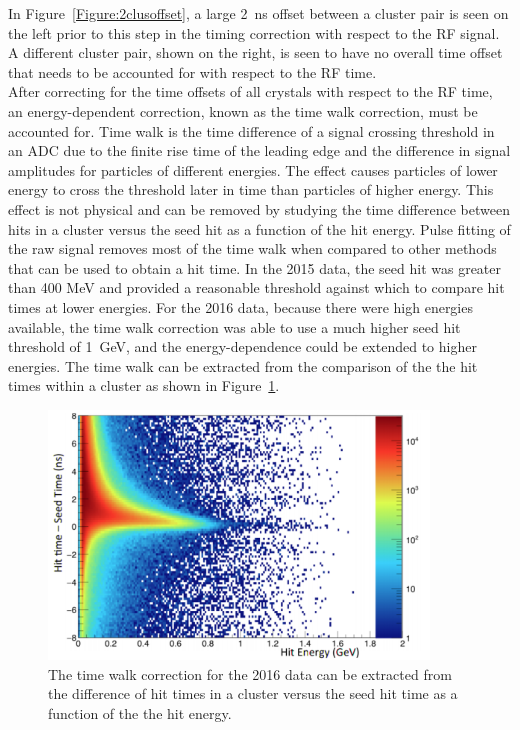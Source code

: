 \documentclass[12pt]{report}
\begin{document}
In Figure~\ref{Figure:2clusoffset}, a large 2~ns offset between a cluster pair is seen on the left prior to this step in the timing correction with respect to the RF signal. A different cluster pair, shown on the right, is seen to have no overall time offset that needs to be accounted for with respect to the RF time. \\
\indent After correcting for the time offsets of all crystals with respect to the RF time, an energy-dependent correction, known as the time walk correction, must be accounted for. Time walk is the time difference of a signal crossing threshold in an ADC due to the finite rise time of the leading edge and the difference in signal amplitudes for particles of different energies. The effect causes particles of lower energy to cross the threshold later in time than particles of higher energy. This effect is not physical and can be removed by studying the time difference between hits in a cluster versus the seed hit as a function of the hit energy. Pulse fitting of the raw signal removes most of the time walk when compared to other methods that can be used to obtain a hit time. In the 2015 data, the seed hit was greater than 400 MeV and provided a reasonable threshold against which to compare hit times at lower energies. For the 2016 data, because there were high energies available, the time walk correction was able to use a much higher seed hit threshold of 1~GeV, and the energy-dependence could be extended to higher energies. The time walk can be extracted from the comparison of the the hit times within a cluster as shown in Figure~\ref{Figure:hittimeincluster}.

\begin{figure}[H]
  \centering
      \includegraphics[width=0.9\textwidth]{pics/performance/hittimeincluster.png}
  \caption[Hit times in a cluster versus the hit energy]{The time walk correction for the 2016 data can be extracted from the difference of hit times in a cluster versus the seed hit time as a function of the the hit energy.}
  \label{Figure:hittimeincluster}
\end{figure}
\end{document}
